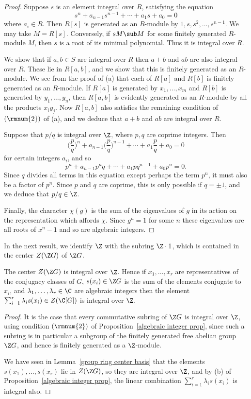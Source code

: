 \begin{proof}
Suppose $s$ is an element integral over $R$, satisfying the equation
\[s^n+a_{n-1}s^{n-1}+\cdots+a_1s+a_0=0\]
where $a_i\in R$. Then $R[s]$ is generated as an $R$-module by $1,s,s^2,\dots,s^{n-1}$. We may take $M=R[s]$. Conversely, if $sM\sub M$ for some finitely generated $R$-module $M$, then $s$ is a root of its minimal polynomial. Thus it is integral over $R$.\par
We show that if $a,b\in S$ are integral over $R$ then $a+b$ and $ab$ are also integral over $R$. These lie in $R[a,b]$, and we show that this is finitely generated as an $R$-module. We see from the proof of (a) that each of $R[a]$ and $R[b]$ is finitely generated as an $R$-module. If $R[a]$ is generated by $x_1,\dots,x_m$ and $R[b]$ is generated by $y_1,\dots,y_n$, then $R[a,b]$ is evidently generated as an $R$-module by all the products $x_iy_j$. Now $R[a,b]$ also satisfies the remaining condition of $(\rmnum{2})$ of (a), and we deduce that $a+b$ and $ab$ are integral over $R$.\par
Suppose that $p/q$ is integral over $\Z$, where $p,q$ are coprime integers. Then
\[\Big(\frac{p}{q}\Big)^n+a_{n-1}\Big(\frac{p}{q}\Big)^{n-1}+\cdots+a_1\frac{p}{q}+a_0=0\]
for certain integers $a_i$, and so
\[p^n+a_{n-1}p^nq+\cdots+a_1pq^{n-1}+a_0p^n=0.\]
Since $q$ divides all terms in this equation except perhaps the term $p^n$, it must also be a factor of $p^n$. Since $p$ and $q$ are coprime, this is only possible if $q=\pm 1$, and we deduce that $p/q\in\Z$.\par
Finally, the character $\chi(g)$ is the sum of the eigenvalues of $g$ in its action on the representation which affords $\chi$. Since $g^n=1$ for some $n$ these eigenvalues are all roots of $x^n-1$ and so are algebraic integers.
\end{proof}
In the next result, we identify $\Z$ with the subring $\Z\cdot 1$, which is contained in the center $Z(\Z G)$ of $\Z G$.
\begin{proposition}\label{group ring ZG center integral over Z}
The center $Z(\Z G)$ is integral over $\Z$. Hence if $x_1,\dots,x_r$ are representatives of the conjugacy classes of $G$, $s(x_i)\in\Z G$ is the sum of the elements conjugate to $x_i$, and $\lambda_1,\dots,\lambda_r\in\C$ are algebraic integers then the element $\sum_{i=1}^{r}\lambda_is(x_i)\in Z(\C[G])$ is integral over $\Z$.
\end{proposition}
\begin{proof}
It is the case that every commutative subring of $\Z G$ is integral over $\Z$, using condition $(\rmnum{2})$ of Proposition~\ref{algebraic integer prop}, since such a subring is in particular a subgroup of the finitely generated free abelian group $\Z G$, and hence is finitely generated as a $\Z$-module.\par
We have seen in Lemma~\ref{group ring center basis} that the elements $s(x_1),\dots,s(x_r)$ lie in $Z(\Z G)$, so they are integral over $\Z$, and by (b) of Proposition~\ref{algebraic integer prop}, the linear combination $\sum_{i=1}^{r}\lambda_is(x_i)$ is integral also.
\end{proof}
